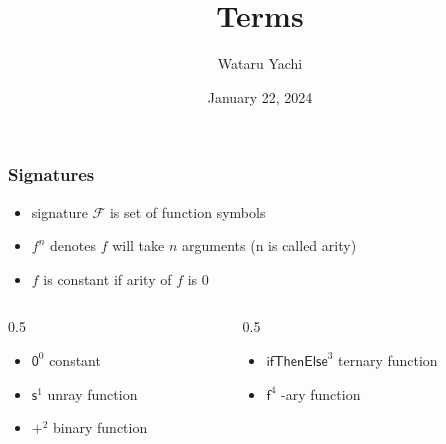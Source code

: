 \documentclass[12pt,aspectratio=169]{beamer}
\title{ Terms }
\author{Wataru Yachi}
\institute{JAIST}
\date{January 22, 2024}
\newcommand{\m}[1]{\mathsf{#1}}
\newcommand{\FF}{\mathcal{F}}
\newlength{\mytotalwidth}
\newlength{\mycolumnwidth}
\begin{document}
\maketitle

\begin{frame}
    \frametitle{Signatures}
    \begin{definition}
        \begin{itemize}
            \item \alert{signature} $\FF$ is set of function symbols
            \item \alert{$f^n$} denotes $f$ will take $n$ arguments (n is called \alert{arity})
            \item $f$ is \alert{constant} if arity of $f$ is 0
        \end{itemize}
    \end{definition}

    \begin{example}
        \begin{columns}[totalwidth=\mytotalwidth]
        \begin{column}[t]{0.5\mycolumnwidth}
            \begin{itemize}
                \item $\mathsf{0}^0$ \quad \alert{constant}
                \item $\m{s}^1$ \quad unray function
                \item $\m{+}^2$ \quad binary function
            \end{itemize}
        \end{column}
        \begin{column}[t]{0.5\mycolumnwidth}
            \begin{itemize}
                \item $\m{ifThenElse}^3$ \quad ternary function
                \item $\m{f}^4$ -ary function
            \end{itemize}
        \end{column}
        \end{columns}
    \end{example}
\end{frame}
\end{document}
